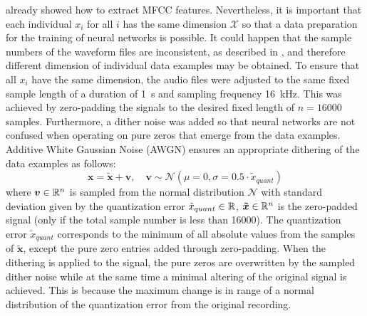  already showed how to extract MFCC features.
Nevertheless, it is important that each individual $x_i$ for all $i$ has the same dimension $\mathcal{X}$ so that a data preparation for the training of neural networks is possible.
It could happen that the sample numbers of the waveform files are inconsistent, as described in , and therefore different dimension of individual data examples may be obtained.
To ensure that all $x_i$ have the same dimension, the audio files were adjusted to the same fixed sample length of a duration of \SI{1}{\second} and sampling frequency \SI{16}{\kilo\hertz}.
This was achieved by zero-padding the signals to the desired fixed length of $n = 16000$ samples.
Furthermore, a dither noise was added so that neural networks are not confused when operating on pure zeros that emerge from the data examples.
Additive White Gaussian Noise (AWGN) ensures an appropriate dithering of the data examples as follows:
\begin{equation}\label{eq:exp_dither}
  \bm{x} = \bm{\tilde{x}} + \bm{v}, \quad \bm{v} \sim \mathcal{N}(\mu=0, \sigma=0.5 \cdot \tilde{x}_{quant}) 
\end{equation}
where $\bm{v} \in \mathbb{R}^n$ is sampled from the normal distribution $\mathcal{N}$ with standard deviation given by the quantization error $\tilde{x}_{quant} \in \mathbb{R}$, $\bm{\tilde{x}} \in \mathbb{R}^n$ is the zero-padded signal (only if the total sample number is less than 16000).
The quantization error $\tilde{x}_{quant}$ corresponds to the minimum of all absolute values from the samples of $\bm{\tilde{x}}$, except the pure zero entries added through zero-padding.
When the dithering is applied to the signal, the pure zeros are overwritten by the sampled dither noise while at the same time a minimal altering of the original signal is achieved.
This is because the maximum change is in range of a normal distribution of the quantization error from the original recording.